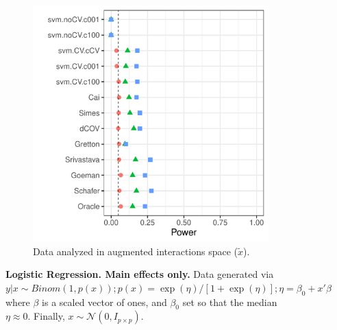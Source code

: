\documentclass[oupdraft]{bio}
\begin{document}
\begin{figure}[th]
\begin{subfigure}[t]{.45\columnwidth}
		\includegraphics[width=1\columnwidth]{"file44"}
		\caption{Data analyzed in augmented interactions space ($\tilde x$).}
		\label{fig:main-only-augmented-space}
	\end{subfigure}
	\caption{\textbf{Logistic Regression. Main effects only.} 
	Data generated via $y|x \sim Binom(1,p(x));
	p(x)=\exp(\eta)/[1+\exp(\eta)];
	\eta=\beta_0+x'\beta$ where 
	$\beta$ is a scaled vector of ones, and $\beta_0$ set so that the median $\eta \approx0$.
	Finally, $x\sim \mathcal{N}(0,I_{p\times p})$. } 
	\label{fig:logistic-main-only}
\end{figure}
\end{document}
